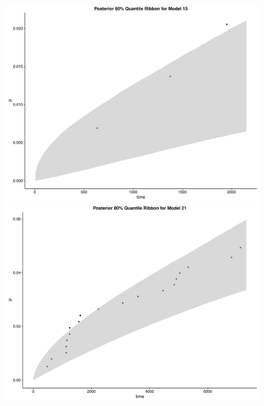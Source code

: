 \documentclass{scrartcl}
\begin{document}
\begin{figure}[H]
  \centering
  \begin{minipage}[b]{0.4\textwidth}
    \includegraphics[width=\textwidth]{plot3.pdf}
  \end{minipage}
  \hfill
  \begin{minipage}[b]{0.4\textwidth}
    \includegraphics[width=\textwidth]{plot4.pdf}
  \end{minipage}
\end{figure}
\end{document}
